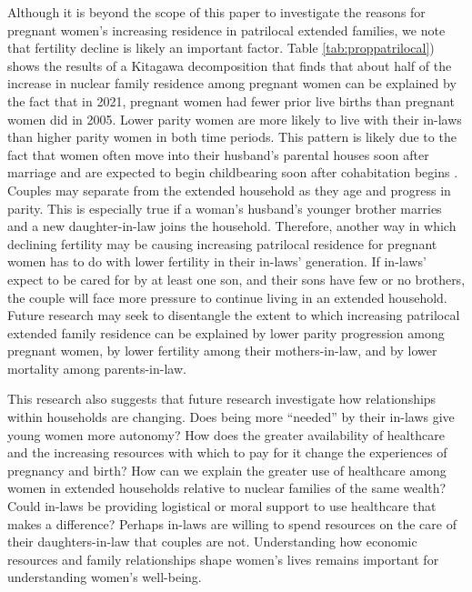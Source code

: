 \documentclass[10pt,twoside,reqno]{article}
\begin{document}
Although it is beyond the scope of this paper to investigate the reasons for pregnant women's increasing residence in patrilocal extended families, we note that fertility decline is likely an important factor.  Table \ref{tab:proppatrilocal}) shows the results of a Kitagawa decomposition that finds that about half of the increase in nuclear family residence among pregnant women can be explained by the fact that in 2021, pregnant women had fewer prior live births than pregnant women did in 2005.  Lower parity women are more likely to live with their in-laws than higher parity women in both time periods.  This pattern is likely due to the fact that women often move into their husband's parental houses soon after marriage \cite{breton2021modernisation} and are expected to begin childbearing soon after cohabitation begins \citep{ibarra2020desire}. Couples may separate from the extended household as they age and progress in parity. This is especially true if a woman's husband's younger brother marries and a new daughter-in-law joins the household.  Therefore, another way in which declining fertility may be causing increasing patrilocal residence for pregnant women has to do with lower fertility in their in-laws' generation.  If in-laws' expect to be cared for by at least one son, and their sons have few or no brothers, the couple will face more pressure to continue living in an extended household.  Future research may seek to disentangle the extent to which increasing patrilocal extended family residence can be explained by lower parity progression among pregnant women, by lower fertility among their mothers-in-law, and by lower mortality among parents-in-law. 

This research also suggests that future research investigate how relationships within households are changing. Does being more ``needed'' by their in-laws give young women more autonomy?  How does the greater availability of healthcare and the increasing resources with which to pay for it change the experiences of pregnancy and birth?  How can we explain the greater use of healthcare among women in extended households relative to nuclear families of the same wealth?  Could in-laws be providing logistical or moral support to use healthcare that makes a difference?  Perhaps in-laws are willing to spend resources on the care of their daughters-in-law that couples are not.  Understanding how economic resources and family relationships shape women's lives remains important for understanding women's well-being. 
\end{document}
